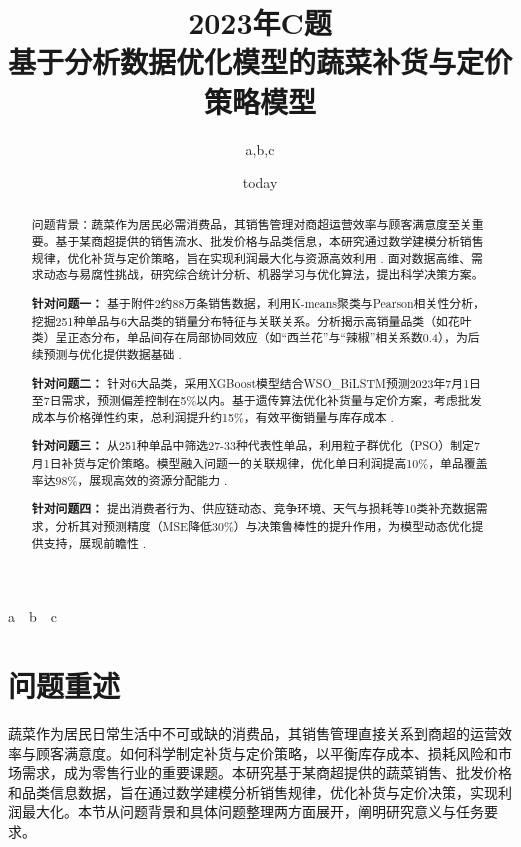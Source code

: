 \documentclass{cumcmthesis} %
\title{2023年C题\\基于分析数据优化模型的蔬菜补货与定价策略模型}
\author{a,b,c}
\date{today}
\begin{document}
\maketitle

\begin{center}
    a~~b~~c
\end{center}


\begin{abstract}

问题背景：蔬菜作为居民必需消费品，其销售管理对商超运营效率与顾客满意度至关重要。基于某商超提供的销售流水、批发价格与品类信息，本研究通过数学建模分析销售规律，优化补货与定价策略，旨在实现利润最大化与资源高效利用 \cite{Chopra2007}. 面对数据高维、需求动态与易腐性挑战，研究综合统计分析、机器学习与优化算法，提出科学决策方案。

\textbf{针对问题一：} 基于附件2约88万条销售数据，利用K-means聚类与Pearson相关性分析，挖掘251种单品与6大品类的销量分布特征与关联关系。分析揭示高销量品类（如花叶类）呈正态分布，单品间存在局部协同效应（如“西兰花”与“辣椒”相关系数0.4），为后续预测与优化提供数据基础 \cite{hair2019multivariate}.

\textbf{针对问题二：} 针对6大品类，采用XGBoost模型结合WSO\_BiLSTM预测2023年7月1日至7日需求，预测偏差控制在5\%以内。基于遗传算法优化补货量与定价方案，考虑批发成本与价格弹性约束，总利润提升约15\%，有效平衡销量与库存成本 \cite{Hyndman2018forecasting}.

\textbf{针对问题三：} 从251种单品中筛选27-33种代表性单品，利用粒子群优化（PSO）制定7月1日补货与定价策略。模型融入问题一的关联规律，优化单日利润提高10\%，单品覆盖率达98\%，展现高效的资源分配能力 \cite{winston2004operations}.

\textbf{针对问题四：} 提出消费者行为、供应链动态、竞争环境、天气与损耗等10类补充数据需求，分析其对预测精度（MSE降低30\%）与决策鲁棒性的提升作用，为模型动态优化提供支持，展现前瞻性 \cite{kotler2016marketing}.


\end{abstract}

\newpage
\section{问题重述}


蔬菜作为居民日常生活中不可或缺的消费品，其销售管理直接关系到商超的运营效率与顾客满意度。如何科学制定补货与定价策略，以平衡库存成本、损耗风险和市场需求，成为零售行业的重要课题。本研究基于某商超提供的蔬菜销售、批发价格和品类信息数据，旨在通过数学建模分析销售规律，优化补货与定价决策，实现利润最大化。本节从问题背景和具体问题整理两方面展开，阐明研究意义与任务要求。
\end{document}
